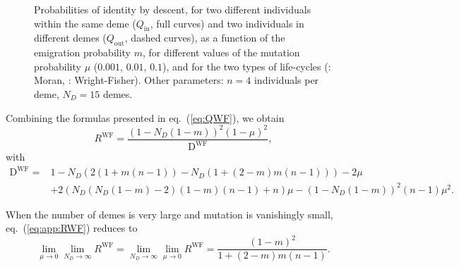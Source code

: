 \documentclass[11pt, letterpaper]{article}
\renewcommand{\eqref}[1]{\textup{{\normalfont eq.~(\ref{#1}}\normalfont)}}
\newcommand{\WF}{\textrm{WF}}
\newcommand{\inn}{\textrm{in}}
\newcommand{\out}{\textrm{out}}
\newcommand{\Qin}{Q_{\inn}}
\newcommand{\Qout}{Q_{\out}}
\newcommand{\ndemes}{N_D}
\begin{document}
\begin{figure}[h]
\begin{tabular}{cc}
\end{tabular}
\caption{Probabilities of identity by descent, for two different individuals within the same deme ($\Qin$, full curves) and two individuals in different demes ($\Qout$, dashed curves), as a function of the emigration probability $m$, for different values of the mutation probability $\mu$ ($0.001$, $0.01$, $0.1$), and for the two types of life-cycles (: Moran, : Wright-Fisher). Other parameters: $n=4$ individuals per deme, $\ndemes = 15$ demes. }
\label{fig:Q}
\end{figure}

Combining the formulas presented in \eqref{eq:QWF}, we obtain
\begin{equation}\label{eq:app:RWF}
R^{\WF} = \frac{(1 - \ndemes (1-m))^2 (1-\mu)^2}{\mathrm{D}^{\WF} },
\end{equation}
with
\begin{equation*}
\begin{split}
\mathrm{D}^{\WF} = & 1-\ndemes (2 (1+m (n-1))-\ndemes (1+(2-m) m (n-1)))-2 \mu \\ &+ 2 (\ndemes (\ndemes (1-m)-2) (1-m) (n-1) + n) \mu - (1-\ndemes (1-m))^2 (n-1) \mu^2.
\end{split}
\end{equation*}

When the number of demes is very large and mutation is vanishingly small, \eqref{eq:app:RWF} reduces to 
%
\begin{equation}\label{eq:app:RWFlim}
\lim_{\mu \to 0} \lim_{\ndemes \to \infty} R^{\WF} = \lim_{\ndemes \to \infty} \lim_{\mu \to 0}  R^{\WF} =  \frac{(1 - m)^2}{1 + (2 - m) m (n - 1)}.
\end{equation}
\end{document}

